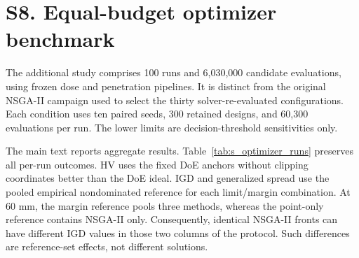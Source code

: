 \section*{S8. Equal-budget optimizer benchmark}
The additional study comprises 100 runs and 6,030,000 candidate evaluations, using frozen dose and penetration pipelines. It is distinct from the original NSGA-II campaign used to select the thirty solver-re-evaluated configurations. Each condition uses ten paired seeds, 300 retained designs, and 60,300 evaluations per run. The lower limits are decision-threshold sensitivities only.

The main text reports aggregate results. Table~\ref{tab:s_optimizer_runs} preserves all per-run outcomes. HV uses the fixed DoE anchors without clipping coordinates better than the DoE ideal. IGD and generalized spread use the pooled empirical nondominated reference for each limit/margin combination. At 60 mm, the margin reference pools three methods, whereas the point-only reference contains NSGA-II only. Consequently, identical NSGA-II fronts can have different IGD values in those two columns of the protocol. Such differences are reference-set effects, not different solutions.

